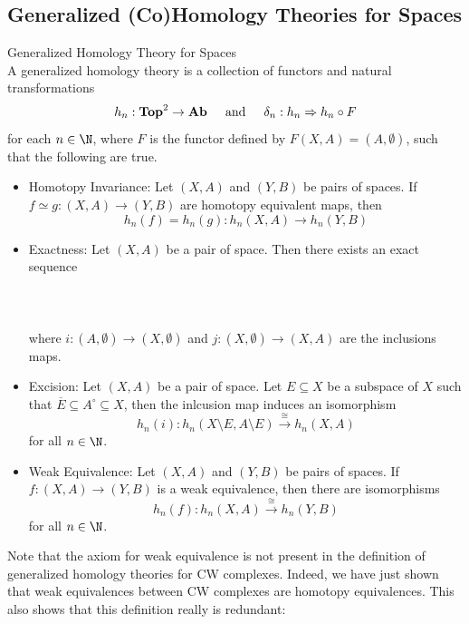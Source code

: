 \documentclass[a4paper]{article}
\begin{document}
\subsection{Generalized (Co)Homology Theories for Spaces}
\begin{defn}{Generalized Homology Theory for Spaces}{}\\
A generalized homology theory is a collection of functors and natural transformations $$h_n:\bold{Top}^2\to\bold{Ab}\;\;\;\;\text{ and }\;\;\;\;\delta_n:h_n\Rightarrow h_n\circ F$$ for each $n\in\N$, where $F$ is the functor defined by $F(X,A)=(A,\emptyset)$, such that the following are true. 
\begin{itemize}
\item Homotopy Invariance: Let $(X,A)$ and $(Y,B)$ be pairs of spaces. If $f\simeq g:(X,A)\to(Y,B)$ are homotopy equivalent maps, then $$h_n(f)=h_n(g):h_n(X,A)\to h_n(Y,B)$$
\item Exactness: Let $(X,A)$ be a pair of space. Then there exists an exact sequence \\~\\
\\~\\
where $i:(A,\emptyset)\to(X,\emptyset)$ and $j:(X,\emptyset)\to(X,A)$ are the inclusions maps. 
\item Excision: Let $(X,A)$ be a pair of space. Let $E\subseteq X$ be a subspace of $X$ such that $\overline{E}\subseteq A^\circ\subseteq X$, then the inlcusion map induces an isomorphism $$h_n(i):h_n(X\setminus E,A\setminus E)\overset{\cong}{\longrightarrow}h_n(X,A)$$ for all $n\in\N$. 
\item Weak Equivalence: Let $(X,A)$ and $(Y,B)$ be pairs of spaces. If $f:(X,A)\to(Y,B)$ is a weak equivalence, then there are isomorphisms $$h_n(f):h_n(X,A)\overset{\cong}{\longrightarrow}h_n(Y,B)$$ for all $n\in\N$. 
\end{itemize}
\end{defn}

Note that the axiom for weak equivalence is not present in the definition of generalized homology theories for CW complexes. Indeed, we have just shown that weak equivalences between CW complexes are homotopy equivalences. This also shows that this definition really is redundant: 
\end{document}
